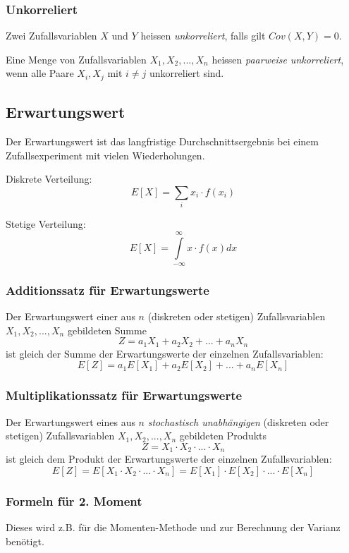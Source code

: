 \documentclass[10pt,a4paper,twocolumn]{article}
\begin{document}
\subsubsection{Unkorreliert}
Zwei Zufallsvariablen $X$ und $Y$ heissen \emph{unkorreliert}, falls gilt $Cov(X,Y)=0$.

Eine Menge von Zufallsvariablen $X_1,X_2,...,X_n$ heissen \emph{paarweise unkorreliert}, wenn alle Paare $X_i,X_j$ mit $i\neq j$ unkorreliert sind.

\subsection{Erwartungswert}
Der Erwartungswert ist das langfristige Durchschnittsergebnis bei einem Zufallsexperiment mit vielen Wiederholungen.

\vspace{10pt}

Diskrete Verteilung:
\[
E[X]=\sum\limits_{i} x_i\cdot f(x_i)
\]

Stetige Verteilung:
\[
E[X]=\int\limits_{-\infty}^{\infty}x\cdot f(x)dx
\]

\subsubsection{Additionssatz für Erwartungswerte}
Der Erwartungswert einer aus $n$ (diskreten oder stetigen) Zufallsvariablen $X_1,X_2,...,X_n$ gebildeten Summe
\[
Z=a_1X_1+a_2X_2+...+a_nX_n
\]
ist gleich der Summe der Erwartungswerte der einzelnen Zufallsvariablen:
\[
E[Z]=a_1E[X_1]+a_2E[X_2]+...+a_nE[X_n]
\]

\subsubsection{Multiplikationssatz für Erwartungswerte}
Der Erwartungswert eines aus $n$ \emph{stochastisch unabhängigen} (diskreten oder stetigen) Zufallsvariablen $X_1,X_2,...,X_n$ gebildeten Produkts
\[
Z=X_1\cdot X_2\cdot ...\cdot X_n
\]
ist gleich dem Produkt der Erwartungswerte der einzelnen Zufallsvariablen:
\[
E[Z]=E[X_1\cdot X_2\cdot ...\cdot X_n]=E[X_1]\cdot E[X_2]\cdot ...\cdot E[X_n]
\]

\subsubsection{Formeln für 2. Moment}
Dieses wird z.B. für die Momenten-Methode und zur Berechnung der Varianz benötigt.
\end{document}
